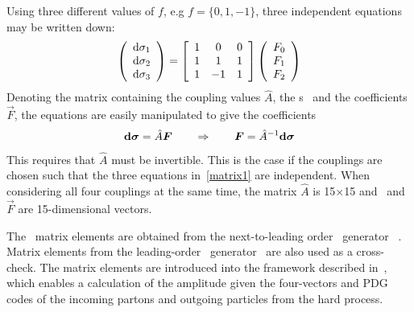 Using three different values of $f$, e.g $f=\{0,1,-1\}$, three independent
equations may be written down:
\begin{eqnarray}\label{matrix1}
\left(\begin{array}{c}
{\rm d}\sigma_1\\
{\rm d}\sigma_2\\
{\rm d}\sigma_3
\end{array}\right) =
\left[\begin{array}{ccc}
1 & 0 & 0 \\
1 & 1 & 1 \\
1 & -1 & 1
\end{array}\right]
\left(\begin{array}{c}
F_0\\
F_1\\
F_2
\end{array}\right)
\end{eqnarray}
Denoting the matrix containing the coupling values $\hat{A}$, the \cx s
\dsigmavec\ and the coefficients $\vec{F}$, the equations are easily
manipulated to give the coefficients 
\begin{eqnarray}\label{matrix2} {\rm \bf d}\boldsymbol{\sigma}=\hat{A}\boldsymbol{F} \qquad \Rightarrow \qquad \boldsymbol{F}=\hat{A}^{-1}{\rm
\bf d}\boldsymbol{\sigma} 
\end{eqnarray} 
This requires that $\hat{A}$ must be invertible. This is the
case if the couplings are chosen such that the three equations in~\ref{matrix1}
are independent. When considering all four couplings at the same time, the
matrix $\hat{A}$ is 15$\times$15 and \dsigmavec\ and $\vec{F}$ are
15-dimensional vectors.

The \TGC\ matrix elements are obtained from the next-to-leading order \mc\
generator \BHO~\cite{bho}. Matrix elements from the leading-order \BR\
generator~\cite{Baur:1994au} are also used as a cross-check. The matrix
elements are introduced into the  framework described in~\cite{Bella:2008wc},
which enables a calculation of the amplitude given the four-vectors and PDG
codes of the incoming partons and outgoing particles from the hard process. 

